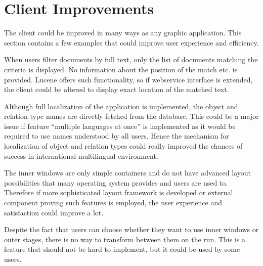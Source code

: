\section{Client Improvements}
The \textan{} client could be improved in many ways as any graphic application.
This section contains a few examples that could improve user experience and
efficiency.

When users filter documents by full text, only the list of documents matching
the criteria is displayed. No information about the position of the match etc.
is provided. Lucene offers such functionality, so if webservice interface is
extended, the client could be altered to display exact location of the matched
text.

Although full localization of the application is implemented, the object and
relation type names are directly fetched from the database. This could be a
major issue if feature ``multiple languages at once'' is implemented as it would
be required to use names understood by all users. Hence the mechanism for
localization of object and relation types could really improved the chances of
success in international multilingual environment.

The inner windows are only simple containers and do not have advanced layout
possibilities that many operating system provides and users are used to.
Therefore if more sophisticated layout framework is developed or external
component proving such features is employed, the user experience and
satisfaction could improve a lot.

Despite the fact that users can choose whether they want to use inner windows
or outer stages, there is no way to transform between them on the run. This is
a feature that should not be hard to implement, but it could be used by some
users.
